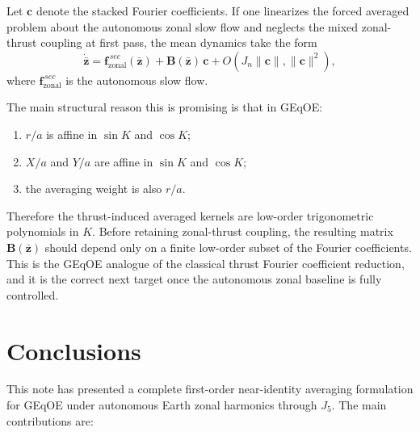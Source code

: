 \documentclass[11pt]{article}
\begin{document}
Let $\bm{c}$ denote the stacked Fourier coefficients. If one linearizes the
forced averaged problem about the autonomous zonal slow flow and neglects the
mixed zonal-thrust coupling at first pass, the mean dynamics take the form
\begin{equation}
\dot{\bar{\bm z}}
= \bm{f}^{\,sec}_{\mathrm{zonal}}(\bar{\bm z})
+ \bm{B}(\bar{\bm z})\,\bm{c}
+ O(J_n\|\bm{c}\|,\|\bm{c}\|^2),
\label{eq:forced_avg_form}
\end{equation}
where $\bm{f}^{\,sec}_{\mathrm{zonal}}$ is the autonomous slow flow.

The main structural reason this is promising is that in GEqOE:
\begin{enumerate}
    \item $r/a$ is affine in $\sin K$ and $\cos K$;
    \item $X/a$ and $Y/a$ are affine in $\sin K$ and $\cos K$;
    \item the averaging weight is also $r/a$.
\end{enumerate}
Therefore the thrust-induced averaged kernels are low-order trigonometric
polynomials in $K$. Before retaining zonal-thrust coupling, the resulting
matrix $\bm{B}(\bar{\bm z})$ should depend only on a finite low-order subset of
the Fourier coefficients. This is the GEqOE analogue of the classical thrust
Fourier coefficient reduction, and it is the correct next target once the
autonomous zonal baseline is fully controlled.

\section{Conclusions}
\label{sec:conclusions}

This note has presented a complete first-order near-identity averaging
formulation for GEqOE under autonomous Earth zonal harmonics through $J_5$.
The main contributions are:
\end{document}
